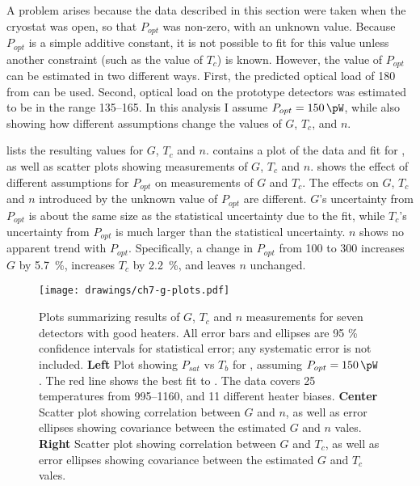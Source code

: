 A problem arises because the data described in this section were taken when the cryostat was open, so that $P_{opt}$ was non-zero, with an unknown value.
Because $P_{opt}$ is a simple additive constant, it is not possible to fit for this value unless another constraint (such as the value of $T_c$) is known.
However, the value of $P_{opt}$ can be estimated in two different ways. 
First, the predicted optical load of \SI{180}{\pW} from  can be used.
Second, optical load on the prototype detectors was estimated to be in the range \SIrange{135}{165}{\pW}.
In this analysis I assume $P_{opt} = \SI{150}{\pW}$, while also showing how different assumptions change the values of  $G$, $T_c$, and $n$.

 lists the resulting values for $G$, $T_c$ and $n$.
 contains a plot of the data and fit for , as well as scatter plots showing measurements of $G$, $T_c$ and $n$.
 shows the effect of different assumptions for $P_{opt}$ on measurements of $G$ and $T_c$.
The effects on $G$, $T_c$ and $n$ introduced by the unknown value of $P_{opt}$ are different.
$G$'s uncertainty from $P_{opt}$ is about the same size as the statistical uncertainty due to the fit, while $T_c$'s uncertainty from $P_{opt}$ is much larger than the statistical uncertainty.
$n$ shows no apparent trend with $P_{opt}$.
Specifically, a change in $P_{opt}$ from \SI{100}{\pW} to \SI{300}{\pW} increases $G$ by \SI{5.7}{\percent}, increases $T_c$ by \SI{2.2}{\percent}, and leaves $n$ unchanged.

\begin{figure*}
\texttt{[image: drawings/ch7-g-plots.pdf]}
\caption[$G$, $T_c$, and $n$ measurements]{
Plots summarizing results of $G$, $T_c$ and $n$ measurements for seven detectors with good heaters.
All error bars and ellipses are 95 \% confidence intervals for statistical error; any systematic error is not included.
\textbf{Left} Plot showing $P_{sat}$ vs $T_b$ for , assuming $P_{opt} = \SI{150}{\pW}$.
The red line shows the best fit to .
The data covers 25 temperatures from \SIrange{995}{1160}{\mK}, and 11 different heater biases.
\textbf{Center} Scatter plot showing correlation between $G$ and $n$, as well as error ellipses showing covariance between the estimated $G$ and $n$ vales.
\textbf{Right} Scatter plot showing correlation between $G$ and $T_c$, as well as error ellipses showing covariance between the estimated $G$ and $T_c$ vales.
} 
\label{fig:heater-g-plots}
\end{figure*}

